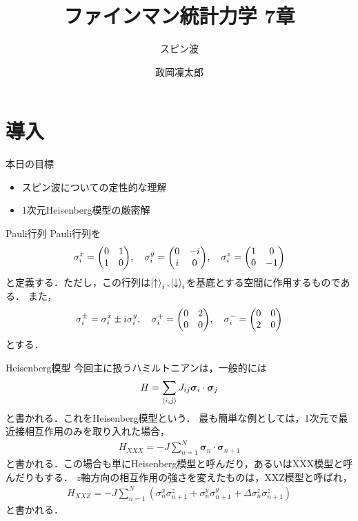 \documentclass[dvipdfmx,9pt]{beamer}
\numberwithin{equation}{section}
\begin{document}
\title{ファインマン統計力学 7章}
\subtitle{スピン波}
\author{政岡凜太郎}
\frame{\titlepage}

\section{導入}

\begin{frame}{本日の目標}
    \begin{itemize}
        \item スピン波についての定性的な理解
        \item 1次元Heisenberg模型の厳密解
    \end{itemize}
\end{frame}

\begin{frame}{Pauli行列}
    Pauli行列を
    \begin{align}
        \sigma_i^x = \mqty(0&1\\1&0), \quad
        \sigma_i^y = \mqty(0&-i\\i&0),\quad
        \sigma_i^z = \mqty(1&0\\0&-1)
    \end{align}
    と定義する．ただし，この行列は$\ket{\uparrow}_i,\ket{\downarrow}_i$を基底とする空間に作用するものである．
    また，
    \begin{align}
        \sigma_i^{\pm} = \sigma_i^x \pm i\sigma_i^y,
        \quad \sigma_i^+ = \mqty(0&2\\0&0),
        \quad \sigma_i^- = \mqty(0&0\\2&0)
    \end{align}
    とする．
\end{frame}

\begin{frame}{Heisenberg模型}
    今回主に扱うハミルトニアンは，一般的には
    \begin{align}
        H =  \sum_{\expval{i,j}} J_{ij}\bm{\sigma}_i \cdot \bm{\sigma}_j
    \end{align}
    と書かれる．これをHeisenberg模型という．
    最も簡単な例としては，1次元で最近接相互作用のみを取り入れた場合，
    \begin{align}
        H_{XXX} = -J \sum_{n=1}^N \bm{\sigma}_n \cdot \bm{\sigma}_{n+1}
    \end{align}
    と書かれる．この場合も単にHeisenberg模型と呼んだり，あるいはXXX模型と呼んだりもする．
    $z$軸方向の相互作用の強さを変えたものは，XXZ模型と呼ばれ，
    \begin{align}
        H_{XXZ} = -J \sum_{n=1}^N (\sigma_n^x \sigma_{n+1}^z + \sigma_n^y \sigma_{n+1}^y + \Delta \sigma_n^z \sigma_{n+1}^z)
    \end{align}
    と書かれる．
\end{frame}
\end{document}
